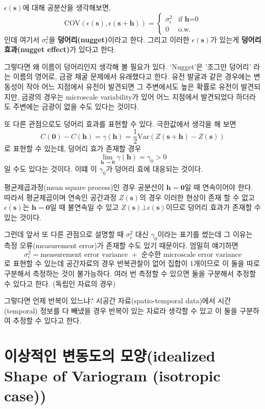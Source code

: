 \documentclass[b5paper,]{book}
\theoremstyle{definition}
\theoremstyle{definition}
\theoremstyle{definition}
\theoremstyle{remark}
\begin{document}
\(\epsilon(\mathbf{s})\)에 대해 공분산을 생각해보면, \[
\text{COV}(\epsilon(\mathbf{s}),\epsilon(\mathbf{s}+\mathbf{h}))= \left\{ \begin{array}{ll}
\sigma_{\epsilon}^{2} & \textrm{if $\mathbf{h}$=0}\\
0 & \textrm{o.w.}
\end{array} \right.
\] 인데 여기서 \(\sigma_{\epsilon}^{2}\)을 \textbf{덩어리(nugget)}이라고
한다. 그리고 이러한 \(\epsilon(\mathbf{s})\)가 있는게 \textbf{덩어리
효과(nugget effect)}가 있다고 한다.

그렇다면 왜 이름이 덩어리인지 생각해 볼 필요가 있다. `Nugget'은 '조그만
덩어리' 라는 이름의 영어로, 금광 채굴 문제에서 유래했다고 한다. 유전
발굴과 같은 경우에는 변동성이 작아 어느 지점에서 유전이 발견되면 그
주변에서도 높은 확률로 유전이 발견되지만, 금광의 경우는 microscale
variability가 있어 어느 지점에서 발견되었다 하더라도 주변에는 금광이
없을 수도 있다는 것이다.

또 다른 관점으로도 덩어리 효과를 표현할 수 있다. 극한값에서 생각을 해
보면
\[C(\mathbf{0})-C(\mathbf{h})=\gamma(\mathbf{h})=\frac{1}{2}\text{Var}(Z(\mathbf{s}+\mathbf{h})-Z(\mathbf{s}))\]
로 표현할 수 있는데, 덩어리 효가 존재할 경우
\[\lim_{\mathbf{h}\rightarrow \mathbf{0}}\gamma(\mathbf{h})=\gamma_{0} >0\]
일 수도 있다는 것이다. 이떄 이 \(\gamma_{0}\)가 덩어리 효에 대응되는
것이다.

평균제곱과정(mean square process)인 경우 공분산이
\(\mathbf{h}=\mathbf{0}\)일 때 연속이어야 한다. 따라서 평균제곱이며
연속인 공간과정 \(Z(\mathbf{s})\)의 경우 이러한 현상이 존재 할 수 없고
\(\epsilon(\mathbf{s})\)는 \(\mathbf{h}=\mathbf{0}\)일 때 불연속일 수
있고 \(Z(\mathbf{s}) \bot \epsilon(\mathbf{s})\)이므로 덩어리 효과가
존재할 수 있는 것이다.

그런데 앞서 또 다른 관점으로 설명할 때 \(\sigma_{\epsilon}^{2}\) 대신
\(\gamma_{0}\)이라는 표기를 썼는데 그 이유는 측정 오류(measurement
error)가 존재할 수도 있기 때문이다. 엄밀히 얘기하면
\[\sigma_{\epsilon}^{2}=\text{measurement error variance } + \text{ 순수한 microscale error variance}\]
로 표현할 수 있는데 공간자료의 경우 반복관찰이 없어 집합이 1개이므로 이
둘을 따로 구분해서 측정하는 것이 불가능하다. 여러 번 측정할 수 있으면
둘을 구분해서 추정할 수 있다고 한다. (독립인 자료의 경우)

그렇다면 언제 반복이 있느냐? 시공간 자료(spatio-temporal data)에서
시간(temporal) 정보를 다 빼냈을 경우 반복이 있는 자료라 생각할 수 있고
이 둘을 구분하여 추정할 수 있다고 한다.

\section{이상적인 변동도의 모양(idealized Shape of Variogram (isotropic
case))}\label{--idealized-shape-of-variogram-isotropic-case}
\end{document}
